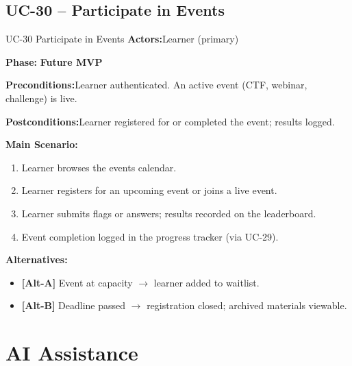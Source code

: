 \documentclass[12pt,a4paper]{report}
\newcommand{\ucfield}[2]{%
    \noindent\textbf{\color{helixpurplemid}#1:}\quad #2\par\medskip
}
\newcommand{\ucphase}[1]{%
    \noindent\textbf{\color{helixpurplemid}Phase:}\quad%
    \ifstrequal{#1}{PoC}{\textcolor{helixteal}{\textbf{PoC}}}{\textcolor{helixamber}{\textbf{Future MVP}}}%
    \par\medskip
}
\begin{document}
\section{UC-30 -- Participate in Events}
\begin{ucbox}{UC-30 \quad Participate in Events}
    \ucfield{Actors}{Learner (primary)}
    \ucphase{Future MVP}
    \ucfield{Preconditions}{Learner authenticated. An active event (CTF, webinar, challenge) is live.}
    \ucfield{Postconditions}{Learner registered for or completed the event; results logged.}
    \textbf{\color{helixpurplemid}Main Scenario:}
    \begin{enumerate}
        \item Learner browses the events calendar.
        \item Learner registers for an upcoming event or joins a live event.
        \item Learner submits flags or answers; results recorded on the leaderboard.
        \item Event completion logged in the progress tracker (via UC-29).
    \end{enumerate}
    \textbf{\color{helixpurplemid}Alternatives:}
    \begin{itemize}
        \item \textbf{[Alt-A]} Event at capacity $\rightarrow$ learner added to waitlist.
        \item \textbf{[Alt-B]} Deadline passed $\rightarrow$ registration closed; archived materials viewable.
    \end{itemize}
\end{ucbox}

\chapter{AI Assistance}
\end{document}
